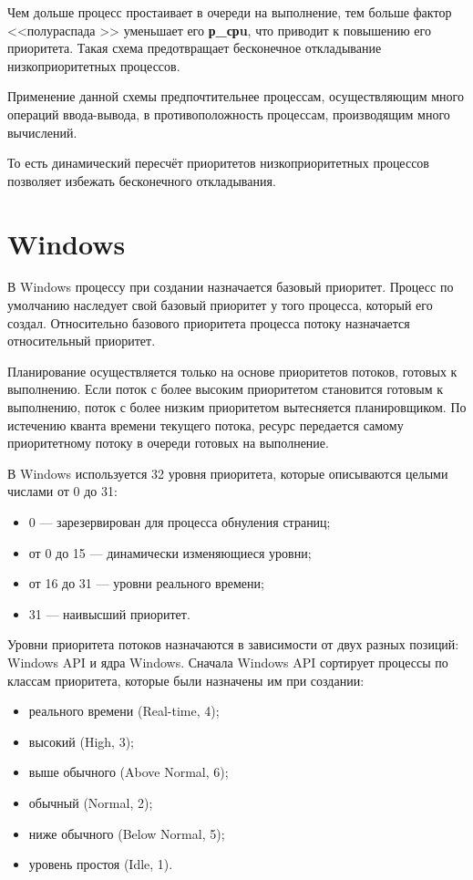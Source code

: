 Чем дольше процесс простаивает в очереди на выполнение, тем больше фактор <<полураспада >> уменьшает его \textbf{р\_срu}, что приводит к повышению его приоритета.
Такая схема предотвращает бесконечное откладывание низкоприоритетных процессов.

Применение данной схемы предпочтительнее процессам, осуществляющим много операций ввода-вывода, в противоположность процессам, производящим много вычислений.

То есть динамический пересчёт приоритетов низкоприоритетных процессов позволяет избежать бесконечного откладывания.

\section{Windows}

В Windows процессу при создании назначается базовый приоритет.
Процесс по умолчанию наследует свой базовый приоритет у того процесса, который его создал.
Относительно базового приоритета процесса потоку назначается относительный приоритет.

Планирование осуществляется только на основе приоритетов потоков, готовых к выполнению.
Если поток с более высоким приоритетом становится готовым к выполнению, поток с более низким приоритетом вытесняется планировщиком.
По истечению кванта времени текущего потока, ресурс передается самому приоритетному потоку в очереди готовых на выполнение.

В Windows используется 32 уровня приоритета, которые описываются целыми числами от 0 до 31:
\begin{itemize}
	\item 0 --- зарезервирован для процесса обнуления страниц;
	\item от 0 до 15 --- динамически изменяющиеся уровни;
	\item от 16 до 31 --- уровни реального времени;
	\item 31 --- наивысший приоритет.
\end{itemize}

Уровни приоритета потоков назначаются в зависимости от двух разных позиций: Windows API и ядра Windows.
Сначала Windows API сортирует процессы по классам приоритета, которые были назначены им при создании:
\begin{itemize}
	\item реального времени (Real-time, 4);
	\item высокий (High, 3);
	\item выше обычного (Above Normal, 6);
	\item обычный (Normal, 2);
	\item ниже обычного (Below Normal, 5);
	\item уровень простоя (Idle, 1).
\end{itemize}

